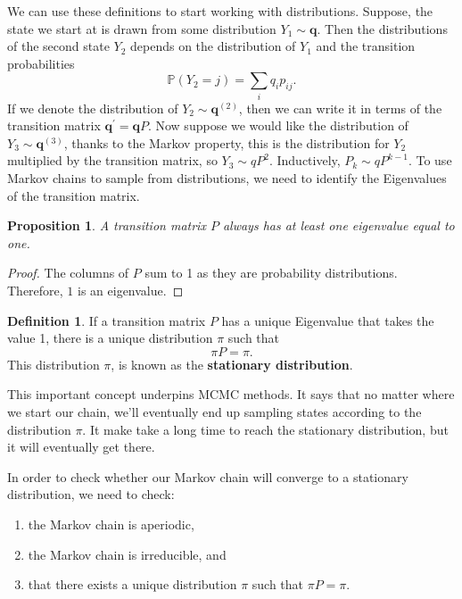 \documentclass[
]{book}
\newtheorem{proposition}{Proposition}[chapter]
\theoremstyle{definition}
\newtheorem{definition}{Definition}[chapter]
\theoremstyle{definition}
\theoremstyle{definition}
\theoremstyle{definition}
\theoremstyle{remark}
\begin{document}
We can use these definitions to start working with distributions. Suppose, the state we start at is drawn from some distribution \(Y_1 \sim \boldsymbol{q}\). Then the distributions of the second state \(Y_2\) depends on the distribution of \(Y_1\) and the transition probabilities
\[
\mathbb{P}(Y_2 = j) = \sum_i q_ip_{ij}.
\]
If we denote the distribution of \(Y_2 \sim \boldsymbol{q}^{(2)}\), then we can write it in terms of the transition matrix \(\boldsymbol{q}^\prime = \boldsymbol{q}P\). Now suppose we would like the distribution of \(Y_3 \sim \boldsymbol{q}^{(3)}\), thanks to the Markov property, this is the distribution for \(Y_2\) multiplied by the transition matrix, so \(Y_3 \sim qP^2\). Inductively, \(P_k \sim qP^{k-1}\). To use Markov chains to sample from distributions, we need to identify the Eigenvalues of the transition matrix.

\begin{proposition}
A transition matrix \(P\) always has at least one eigenvalue equal to one.
\end{proposition}

\begin{proof}
The columns of \(P\) sum to 1 as they are probability distributions. Therefore, \(1\) is an eigenvalue.
\end{proof}

\begin{definition}
If a transition matrix \(P\) has a unique Eigenvalue that takes the value 1, there is a unique distribution \(\pi\) such that
\[
\pi P = \pi. 
\]
This distribution \(\pi\), is known as the \textbf{stationary distribution}.
\end{definition}

This important concept underpins MCMC methods. It says that no matter where we start our chain, we'll eventually end up sampling states according to the distribution \(\pi\). It make take a long time to reach the stationary distribution, but it will eventually get there.

In order to check whether our Markov chain will converge to a stationary distribution, we need to check:

\begin{enumerate}
\def\labelenumi{\arabic{enumi}.}
\item
  the Markov chain is aperiodic,
\item
  the Markov chain is irreducible, and
\item
  that there exists a unique distribution \(\pi\) such that \(\pi P = \pi\).
\end{enumerate}
\end{document}
